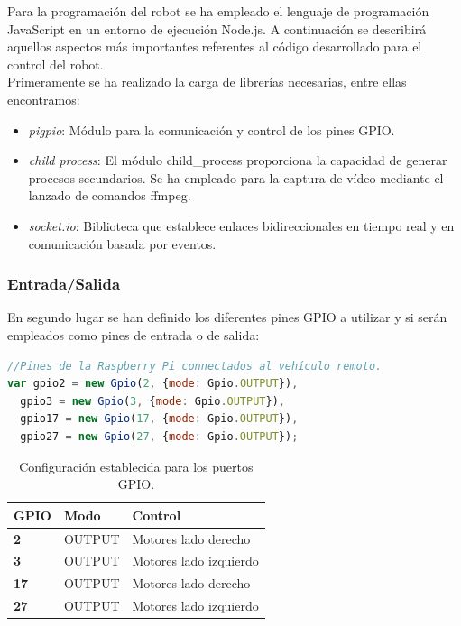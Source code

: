 Para la programación del robot se ha empleado el lenguaje de programación JavaScript en un entorno de ejecución Node.js. A continuación se describirá aquellos aspectos más importantes referentes al código
desarrollado para el control del robot.\\

Primeramente se ha realizado la carga de librerías necesarias, entre ellas encontramos:

\begin{itemize}
 \item \emph{pigpio}: Módulo para la comunicación y control de los pines GPIO.
 \item \emph{child process}: El módulo child\_process proporciona la capacidad de generar procesos secundarios. Se ha empleado para la captura de vídeo mediante el lanzado de comandos ffmpeg.
 \item \emph{socket.io}: Biblioteca que establece enlaces bidireccionales en tiempo real y en comunicación basada por eventos.
\end{itemize}


\subsubsection{Entrada/Salida}

En segundo lugar se han definido los diferentes pines GPIO a utilizar y si serán empleados como pines de entrada o de salida:

\begin{lstlisting}[language=JavaScript]
//Pines de la Raspberry Pi connectados al vehículo remoto.
var gpio2 = new Gpio(2, {mode: Gpio.OUTPUT}),
  gpio3 = new Gpio(3, {mode: Gpio.OUTPUT}),
  gpio17 = new Gpio(17, {mode: Gpio.OUTPUT}),
  gpio27 = new Gpio(27, {mode: Gpio.OUTPUT});
\end{lstlisting}


\begin{table}[H]
  \begin{center}
    \begin{tabular}{|p{2.5cm}|p{2.5cm}|p{4.5cm}|}
      \hline
      {\textbf{GPIO}} & \textbf{ Modo } & \textbf{ Control }\\
      \hline
      {\textbf{ 2 }} & { OUTPUT } & { Motores lado derecho }  \\
     \hline
      {\textbf{ 3 }} & { OUTPUT } & { Motores lado izquierdo } \\
      \hline
      {\textbf{ 17 }} & { OUTPUT } & {  Motores lado derecho } \\
      \hline
      {\textbf{ 27 }} & { OUTPUT } & { Motores lado izquierdo } \\
     \hline   
    \end{tabular}
  \end{center}
\caption{ Configuración establecida para los puertos GPIO. }
\end{table}


